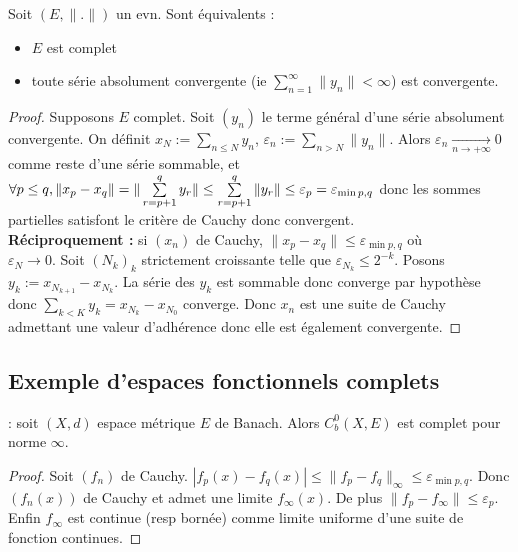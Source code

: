 \begin{lemme} 

Soit $(E,\|.\|)$ un evn. Sont équivalents :
    \begin{itemize}
        \item $E$ est complet
        \item toute série absolument convergente (ie $\sum\limits_{n=1}^{\infty} \|y_n\|<\infty $) est convergente.
    \end{itemize}
\end{lemme}
\begin{proof}
    Supposons $E$ complet. Soit $(y_n)$ le terme général d'une série absolument convergente. 
    On définit $x_N:=\sum\limits_{n\le N}^{} y_n$, $\varepsilon _n:=\sum\limits_{n>N}^{} \|y_n\|$. 
    Alors $\varepsilon _n \xrightarrow[n\to +\infty]{} 0$ comme reste d'une série sommable, et $\forall p\le q,\ \\
    \|x_p-x_q\|=\|\sum\limits_{r=p+1}^{q} y_r\|\le \sum\limits_{r=p+1}^{q} \|y_r\|\le \varepsilon _p = \varepsilon_{\min p,q} $ donc les sommes partielles satisfont le critère de Cauchy donc convergent.\\
    
    \textbf{Réciproquement :} si $(x_{n})$ de Cauchy, $\|x_p-x_q\|\le \varepsilon _{\min p,q}$ où \\
    $\varepsilon _N\to 0$. Soit $(N_k)_k$ strictement croissante telle que $\varepsilon _{N_k}\le 2^{-k}$. Posons $y_k:=x_{N_{k+1}}-x_{N_k}$.
    La série des $y_k$ est sommable donc converge par hypothèse donc $\sum\limits_{k<K}^{} y_k=x_{N_k}-x_{N_0}$ converge. Donc $x_{n}$ est une suite de Cauchy admettant une valeur d'adhérence donc elle est également convergente.
\end{proof}


\subsection{Exemple d'espaces fonctionnels complets}
\begin{ex} : soit $(X,d)$ espace métrique $E$ de Banach. Alors $C^0_b(X,E)$ est complet pour norme $\infty $.
\end{ex}
\begin{proof}
    Soit $(f_n)$ de Cauchy. $|f_p(x)-f_q(x)|\le \|f_p-f_q\|_\infty \le \varepsilon _{\min p,q}$. Donc $(f_n(x))$ de Cauchy et admet une limite $f_\infty (x)$. De plus $\|f_p-f_\infty \|\le \varepsilon _p$. Enfin $f_\infty $ est continue (resp bornée) comme limite uniforme d'une suite de fonction continues.
\end{proof}

